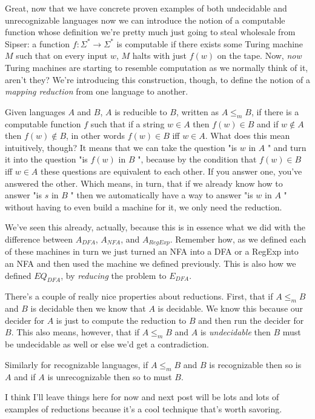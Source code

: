 \documentclass[11pt]{article}
\begin{document}
Great, now that we have concrete proven examples of both undecidable and unrecognizable languages now we can introduce the notion of a computable function whose definition we're pretty much just going to steal wholesale from Sipser: a function $f : \Sigma^* \to \Sigma^*$ is computable if there exists some Turing machine $M$ such that on every input $w$, $M$ halts with just $f(w)$ on the tape. Now, \emph{now} Turing machines are starting to resemble computation as we normally think of it, aren't they? We're introducing this construction, though, to define the notion of a \emph{mapping reduction} from one language to another. 

Given languages $A$ and $B$, $A$ is reducible to $B$, written as $A \le_m B$, if there is a computable function $f$ such that if a string $w \in A$ then $f(w) \in B$ and if $w \notin A$ then $f(w) \notin B$, in other words $f(w) \in B$ iff $w \in A$. What does this mean intuitively, though? It means that we can take the question "is $w$ in $A$ " and turn it into the question "is $f(w)$ in $B$ ", because by the condition that $f(w) \in B$ iff $w \in A$ these questions are equivalent to each other. If you answer one, you've answered the other. Which means, in turn, that if we already know how to answer "is $s$ in $B$ " then we automatically have a way to answer "is $w$ in $A$ " without having to even build a machine for it, we only need the reduction. 

We've seen this already, actually, because this is in essence what we did with the difference between $A_{DFA}$, $A_{NFA}$, and $A_{RegExp}$. Remember how, as we defined each of these machines in turn we just turned an NFA into a DFA or a RegExp into an NFA and then used the machine we defined previously. This is also how we defined $EQ_{DFA}$, by \emph{reducing} the problem to $E_{DFA}$.  

There's a couple of really nice properties about reductions. First, that if $A \le_m B$ and $B$ is decidable then we know that $A$ is decidable. We know this because our decider for $A$ is just to compute the reduction to $B$ and then run the decider for $B$. This also means, however, that if $A \le_m B$ and $A$ is \emph{undecidable} then $B$ must be undecidable as well or else we'd get a contradiction.

Similarly for recognizable languages, if $A \le_m B$ and $B$ is recognizable then so is $A$ and if $A$ is unrecognizable then so to must $B$.

I think I'll leave things here for now and next post will be lots and lots of examples of reductions because it's a cool technique that's worth savoring.
\end{document}
